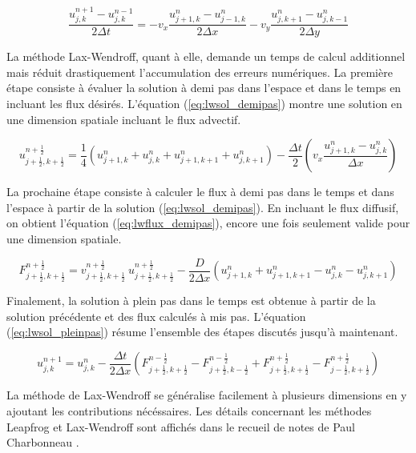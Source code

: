 \documentclass{article}
\begin{document}
\begin{equation}\label{eq:adv_leapfrog}
\frac{ u_{j, k}^{n+1} - u_{j, k}^{n-1} }{2 \Delta t} = - v_x \frac{ u_{j+1, k}^{n} - u_{j-1, k}^{n} }{2 \Delta x} - v_y \frac{ u_{j, k+1}^{n} - u_{j, k-1}^{n} }{2 \Delta y}
\end{equation}

La méthode Lax-Wendroff, quant à elle, demande un temps de calcul additionnel mais réduit drastiquement l'accumulation des erreurs numériques. La première étape consiste à évaluer la solution à demi pas dans l'espace et dans le temps en incluant les flux désirés. L'équation (\ref{eq:lwsol_demipas}) montre une solution en une dimension spatiale incluant le flux advectif.

\begin{equation}\label{eq:lwsol_demipas}
	u_{j+\frac{1}{2}, k+\frac{1}{2}}^{n+\frac{1}{2}} = \frac{1}{4}(u_{j+1,k}^n + u_{j,k}^n + u_{j+1,k+1}^n + u_{j,k+1}^n) - \frac{\Delta t}{2} (v_x \frac{u_{j+1, k}^n - u_{j, k}^n}{\Delta x})
\end{equation}

La prochaine étape consiste à calculer le flux à demi pas dans le temps et dans l'espace à partir de la solution (\ref{eq:lwsol_demipas}). En incluant le flux diffusif, on obtient l'équation (\ref{eq:lwflux_demipas}), encore une fois seulement valide pour une dimension spatiale.

\begin{equation}\label{eq:lwflux_demipas}
	F_{j+\frac{1}{2},k+\frac{1}{2}}^{n+\frac{1}{2}} =  v_{j+\frac{1}{2},k+\frac{1}{2}}^{n+\frac{1}{2}} \ u_{j+\frac{1}{2},k+\frac{1}{2}}^{n+\frac{1}{2}} - \frac{D}{2 \Delta x} (u_{j+1, k}^{n} + u_{j+1, k+1}^{n}  - u_{j, k}^{n} - u_{j, k+1}^{n})
\end{equation}

Finalement, la solution à plein pas dans le temps est obtenue à partir de la solution précédente et des flux calculés à mis pas. L'équation (\ref{eq:lwsol_pleinpas}) résume l'ensemble des étapes discutés jusqu'à maintenant.

\begin{equation}\label{eq:lwsol_pleinpas}
	u_{j,k}^{n+1} = u_{j,k}^{n} - \frac{\Delta t}{2 \Delta x} (F_{j+\frac{1}{2},k+\frac{1}{2}}^{n-\frac{1}{2}} - F_{j+\frac{1}{2},k-\frac{1}{2}}^{n-\frac{1}{2}} + F_{j+\frac{1}{2},k+\frac{1}{2}}^{n+\frac{1}{2}} - F_{j-\frac{1}{2},k+\frac{1}{2}}^{n+\frac{1}{2}})
\end{equation}

La méthode de Lax-Wendroff se généralise facilement à plusieurs dimensions en y ajoutant les contributions nécéssaires. Les détails concernant les méthodes Leapfrog et Lax-Wendroff sont affichés dans le recueil de notes de Paul Charbonneau \cite{notes_cours}. 
\end{document}
